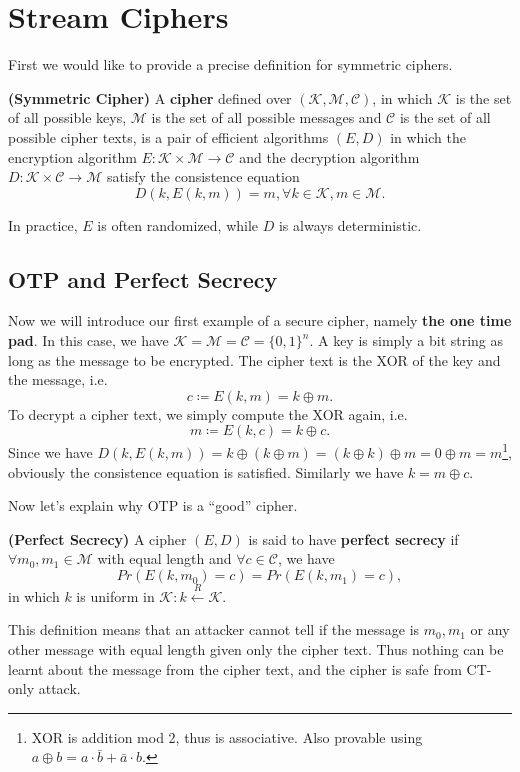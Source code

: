 \ifx\PREAMBLE\undefined


\fi
\chapter{Stream Ciphers}
First we would like to provide a precise definition for symmetric ciphers.
\begin{definition}\textbf{(Symmetric Cipher)}
A \textbf{cipher} defined over $(\mathcal{K,M,C})$, in which $\mathcal{K}$ is the set of all possible keys, $\mathcal{M}$ is the set of all possible messages and $\mathcal{C}$ is the set of all possible cipher texts, is a pair of efficient algorithms $(E,D)$ in which the encryption algorithm $E:\mathcal{K\times M}\rightarrow\mathcal{C}$ and the decryption algorithm $D:\mathcal{K\times C}\rightarrow \mathcal{M}$ satisfy the consistence equation
\begin{equation*}
D(k,E(k,m))=m, \forall k\in\mathcal{K},m\in\mathcal{M}.
\end{equation*}
\end{definition}
In practice, $E$ is often randomized, while $D$ is always deterministic.
\section{OTP and Perfect Secrecy}
Now we will introduce our first example of a secure cipher, namely \textbf{the one time pad}. In this case, we have $\mathcal{K=M=C=}\{0,1\}^n$. A key is simply a bit string as long as the message to be encrypted. The cipher text is the XOR of the key and the message, i.e.
\begin{equation*}
c\coloneqq E(k,m)= k\oplus m.
\end{equation*}
To decrypt a cipher text, we simply compute the XOR again, i.e.
\begin{equation*}
m\coloneqq E(k,c)= k\oplus c.
\end{equation*}
Since we have $D(k,E(k,m))=k\oplus(k\oplus m)=(k\oplus k)\oplus m=0\oplus m=m$\footnote{XOR is addition mod 2, thus is associative. Also provable using $a\oplus b=a\cdot\bar{b}+\bar{a}\cdot b$.}, obviously the consistence equation is satisfied. Similarly we have $k=m\oplus c$.

Now let's explain why OTP is a ``good'' cipher.
\begin{definition}\textbf{(Perfect Secrecy)}
A cipher $(E,D)$ is said to have \textbf{perfect secrecy} if $\forall m_0,m_1\in\mathcal{M}$ with equal length and $\forall c\in\mathcal{C}$, we have 
\begin{equation*}
Pr(E(k,m_0)=c)=Pr(E(k,m_1)=c),
\end{equation*}
in which $k$ is uniform in $\mathcal{K}: k\xleftarrow{R}\mathcal{K}.$
\end{definition}
This definition means that an attacker cannot tell if the message is $m_0, m_1$ or any other message with equal length given only the cipher text. Thus nothing can be learnt about the message from the cipher text, and the cipher is safe from CT-only attack. 

